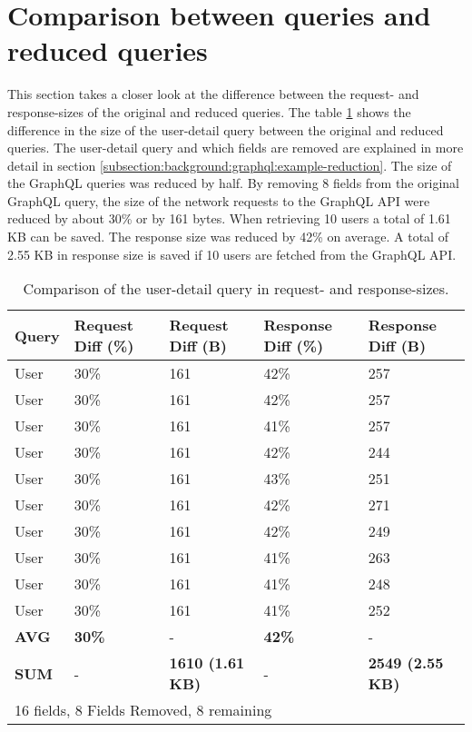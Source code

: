 \section{Comparison between queries and reduced queries}

This section takes a closer look at the difference between the request- and response-sizes of the original and reduced queries. The table \ref{table:code:comparison-user-reduction} shows the difference in the size of the user-detail query between the original and reduced queries. The user-detail query and which fields are removed are explained in more detail in section \ref{subsection:background:graphql:example-reduction}.
The size of the GraphQL queries was reduced by half. By removing 8 fields from the original GraphQL query, the size of the network requests to the GraphQL \ac{API} were reduced by about 30\% or by 161 bytes. When retrieving 10 users a total of 1.61 KB can be saved. The response size was reduced by 42\% on average. A total of 2.55 KB in response size is saved if 10 users are fetched from the GraphQL \ac{API}.

\ifshowTables
\begin{table}[H]
  \begin{tabular}{|l|l|l|l|l|}
  \hline
  \textbf{Query} & \textbf{Request Diff (\%)} & \textbf{Request Diff (B)} & \textbf{Response Diff (\%)} & \textbf{Response Diff (B)} \\
  \hline
  User & 30\% & 161 & 42\% & 257 \\
  \hline
  User & 30\% & 161 & 42\% & 257 \\
  \hline
  User & 30\% & 161 & 41\% & 257 \\
  \hline
  User & 30\% & 161 & 42\% & 244 \\
  \hline
  User & 30\% & 161 & 43\% & 251 \\
  \hline
  User & 30\% & 161 & 42\% & 271 \\
  \hline
  User & 30\% & 161 & 42\% & 249 \\
  \hline
  User & 30\% & 161 & 41\% & 263 \\
  \hline
  User & 30\% & 161 & 41\% & 248 \\
  \hline
  User & 30\% & 161 & 41\% & 252 \\
  \hline
  \hline
  \textbf{AVG} & \textbf{30\%} & - & \textbf{42\%} & -  \\
  \hline
  \hline
  \textbf{SUM} & - & \textbf{1610 (1.61 KB)} & - & \textbf{2549 (2.55 KB)} \\
  \hline
  \multicolumn{5}{l}{16 fields, 8 Fields Removed, 8 remaining}
  \end{tabular}
  \caption{Comparison of the user-detail query in request- and response-sizes.}\label{table:code:comparison-user-reduction}
\end{table}
\fi

